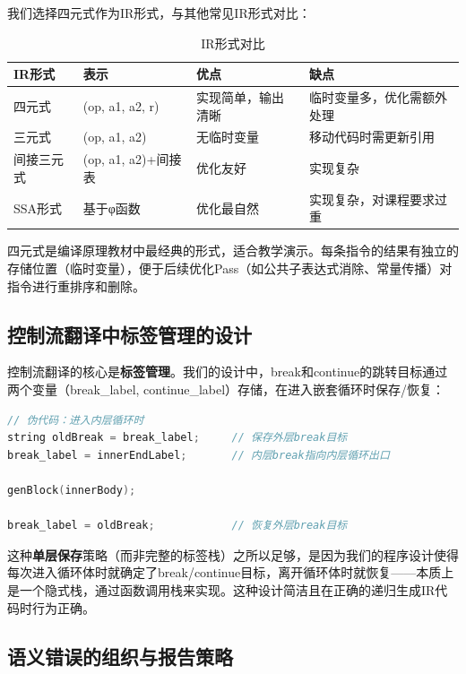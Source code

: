 \documentclass[12pt,a4paper]{ctexart}
\begin{document}
我们选择四元式作为IR形式，与其他常见IR形式对比：

\begin{table}[H]
\centering
\caption{IR形式对比}
\begin{tabular}{|l|l|l|l|}
\hline
\textbf{IR形式} & \textbf{表示} & \textbf{优点} & \textbf{缺点} \\
\hline
四元式 & (op, a1, a2, r) & 实现简单，输出清晰 & 临时变量多，优化需额外处理 \\
\hline
三元式 & (op, a1, a2) & 无临时变量 & 移动代码时需更新引用 \\
\hline
间接三元式 & (op, a1, a2)+间接表 & 优化友好 & 实现复杂 \\
\hline
SSA形式 & 基于φ函数 & 优化最自然 & 实现复杂，对课程要求过重 \\
\hline
\end{tabular}
\end{table}

四元式是编译原理教材中最经典的形式，适合教学演示。每条指令的结果有独立的存储位置（临时变量），便于后续优化Pass（如公共子表达式消除、常量传播）对指令进行重排序和删除。

\subsection{控制流翻译中标签管理的设计}

控制流翻译的核心是\textbf{标签管理}。我们的设计中，break和continue的跳转目标通过两个变量（break\_label, continue\_label）存储，在进入嵌套循环时保存/恢复：

\begin{lstlisting}[language=C++, caption={嵌套循环的标签栈管理}]
// 伪代码：进入内层循环时
string oldBreak = break_label;     // 保存外层break目标
break_label = innerEndLabel;       // 内层break指向内层循环出口

genBlock(innerBody);

break_label = oldBreak;            // 恢复外层break目标
\end{lstlisting}

这种\textbf{单层保存}策略（而非完整的标签栈）之所以足够，是因为我们的程序设计使得每次进入循环体时就确定了break/continue目标，离开循环体时就恢复——本质上是一个隐式栈，通过函数调用栈来实现。这种设计简洁且在正确的递归生成IR代码时行为正确。

\subsection{语义错误的组织与报告策略}
\end{document}
